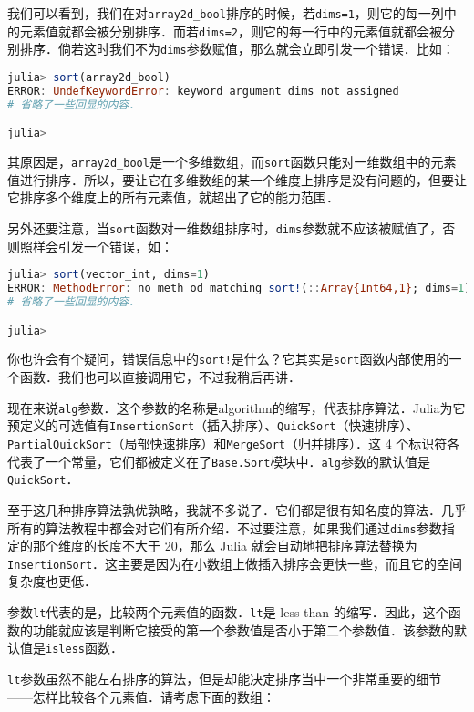 我们可以看到，我们在对\verb|array2d_bool|排序的时候，若\verb|dims=1|，则它的每一列中的元素值就都会被分别排序．而若\verb|dims=2|，则它的每一行中的元素值就都会被分别排序．倘若这时我们不为\verb|dims|参数赋值，那么就会立即引发一个错误．比如：

\begin{lstlisting}[language=julia]
julia> sort(array2d_bool)
ERROR: UndefKeywordError: keyword argument dims not assigned
# 省略了一些回显的内容．

julia> 
\end{lstlisting}

其原因是，\verb|array2d_bool|是一个多维数组，而\verb|sort|函数只能对一维数组中的元素值进行排序．所以，要让它在多维数组的某一个维度上排序是没有问题的，但要让它排序多个维度上的所有元素值，就超出了它的能力范围．

另外还要注意，当\verb|sort|函数对一维数组排序时，\verb|dims|参数就不应该被赋值了，否则照样会引发一个错误，如：

\begin{lstlisting}[language=julia]
julia> sort(vector_int, dims=1)
ERROR: MethodError: no meth od matching sort!(::Array{Int64,1}; dims=1)
# 省略了一些回显的内容．

julia> 
\end{lstlisting}

你也许会有个疑问，错误信息中的\verb|sort!|是什么？它其实是\verb|sort|函数内部使用的一个函数．我们也可以直接调用它，不过我稍后再讲．

现在来说\verb|alg|参数．这个参数的名称是algorithm的缩写，代表排序算法．Julia为它预定义的可选值有\verb|InsertionSort|（插入排序）、\verb|QuickSort|（快速排序）、\verb|PartialQuickSort|（局部快速排序）和\verb|MergeSort|（归并排序）．这 4 个标识符各代表了一个常量，它们都被定义在了\verb|Base.Sort|模块中．\verb|alg|参数的默认值是\verb|QuickSort|．

至于这几种排序算法孰优孰略，我就不多说了．它们都是很有知名度的算法．几乎所有的算法教程中都会对它们有所介绍．不过要注意，如果我们通过\verb|dims|参数指定的那个维度的长度不大于 20，那么 Julia 就会自动地把排序算法替换为\verb|InsertionSort|．这主要是因为在小数组上做插入排序会更快一些，而且它的空间复杂度也更低．

参数\verb|lt|代表的是，比较两个元素值的函数．\verb|lt|是 less than 的缩写．因此，这个函数的功能就应该是判断它接受的第一个参数值是否小于第二个参数值．该参数的默认值是\verb|isless|函数．

\verb|lt|参数虽然不能左右排序的算法，但是却能决定排序当中一个非常重要的细节——怎样比较各个元素值．请考虑下面的数组：

